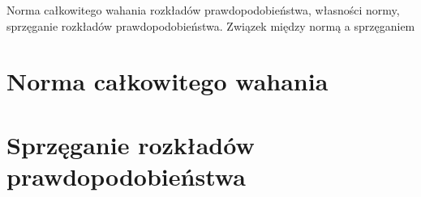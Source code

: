 {
\makeatletter
{}
\makeatother
\graphicspath{{../probabil}}

\begin{questiontext}
	Norma całkowitego wahania rozkładów prawdopodobieństwa, własności normy, sprzęganie rozkładów prawdopodobieństwa. Związek między normą a sprzęganiem
\end{questiontext}

\section{Norma całkowitego wahania}
 {
 }

\section{Sprzęganie rozkładów prawdopodobieństwa}
 {
 }
}
